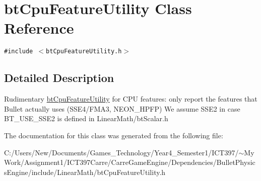 \hypertarget{classbt_cpu_feature_utility}{
\section{btCpuFeatureUtility Class Reference}
\label{classbt_cpu_feature_utility}
}
{\tt \#include $<$btCpuFeatureUtility.h$>$}



\subsection{Detailed Description}
Rudimentary \hyperlink{classbt_cpu_feature_utility}{btCpuFeatureUtility} for CPU features: only report the features that Bullet actually uses (SSE4/FMA3, NEON\_\-HPFP) We assume SSE2 in case BT\_\-USE\_\-SSE2 is defined in LinearMath/btScalar.h 

The documentation for this class was generated from the following file:\begin{CompactItemize}
\item 
C:/Users/New/Documents/Games\_\-Technology/Year4\_\-Semester1/ICT397/$\sim$My Work/Assignment1/ICT397Carre/CarreGameEngine/Dependencies/BulletPhysicsEngine/include/LinearMath/btCpuFeatureUtility.h\end{CompactItemize}
